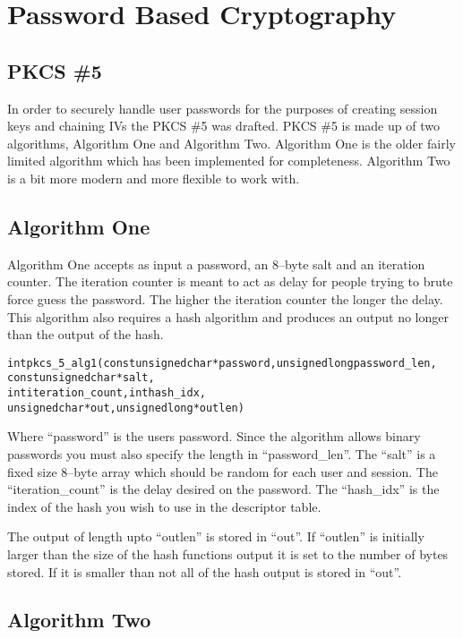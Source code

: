 \documentclass[a4paper]{book}
\begin{document}
\section{Password Based Cryptography}
\subsection{PKCS \#5}
In order to securely handle user passwords for the purposes of creating session keys and chaining IVs the PKCS \#5 was drafted.   PKCS \#5
is made up of two algorithms, Algorithm One and Algorithm Two.  Algorithm One is the older fairly limited algorithm which has been implemented
for completeness.  Algorithm Two is a bit more modern and more flexible to work with.

\subsection{Algorithm One}
Algorithm One accepts as input a password, an 8--byte salt and an iteration counter.  The iteration counter is meant to act as delay for
people trying to brute force guess the password.  The higher the iteration counter the longer the delay.  This algorithm also requires a hash 
algorithm and produces an output no longer than the output of the hash.  

\begin{alltt}
int pkcs_5_alg1(const unsigned char *password, unsigned long password_len, 
                const unsigned char *salt, 
                int iteration_count,  int hash_idx,
                unsigned char *out,   unsigned long *outlen)
\end{alltt}
Where ``password'' is the users password.  Since the algorithm allows binary passwords you must also specify the length in ``password\_len''.  
The ``salt'' is a fixed size 8--byte array which should be random for each user and session.  The ``iteration\_count'' is the delay desired
on the password.  The ``hash\_idx'' is the index of the hash you wish to use in the descriptor table.  

The output of length upto ``outlen'' is stored in ``out''.  If ``outlen'' is initially larger than the size of the hash functions output
it is set to the number of bytes stored.  If it is smaller than not all of the hash output is stored in ``out''.

\subsection{Algorithm Two}
\end{document}
